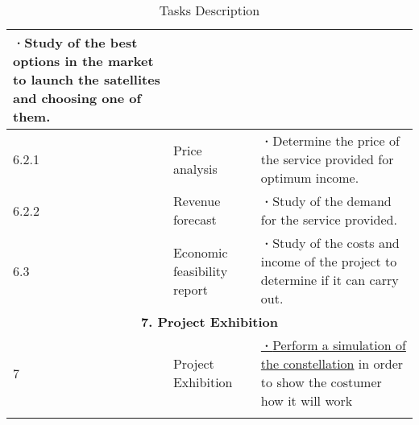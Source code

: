 \begin{longtable}{ | p{1.3cm} | p{3cm} | p{11cm} |}
\textbf{·}Study of the best options in the market to launch the satellites and choosing one of them.\\ 
\hline
6.2.1 & Price analysis &   
\textbf{·}Determine the price of the service provided for optimum income.\\ 
\hline
6.2.2 & Revenue forecast & 
\textbf{·}Study of the demand for the service provided.\\ 
\hline
6.3 & Economic feasibility report & 
\textbf{·}Study of the costs and income of the project to determine if it can carry out.\\ 
 \hline
 \multicolumn{3}{|c|}{\textbf{7. Project Exhibition}} \\ \hline
7 & Project Exhibition & 

\underline{\textbf{·}Perform a simulation of the constellation} in order to show the costumer how it will work \\ \hline
\caption{Tasks Description} \\
\end{longtable}